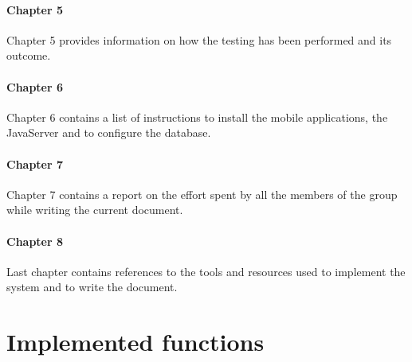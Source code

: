 \documentclass[a4paper,oneside,11pt]{book}
\begin{document}
    \subsubsection{Chapter 5}
    Chapter 5 provides information on how the testing has been performed and its outcome. 

    \subsubsection{Chapter 6}
    Chapter 6 contains a list of instructions to install the mobile applications, the JavaServer and to configure the database.

    \subsubsection{Chapter 7}
    Chapter 7 contains a report on the effort spent by all the members of the group while writing the current document.
    
    \subsubsection{Chapter 8}
    Last chapter contains references to the tools and resources used to implement the system and to write the document.

\chapter{Implemented functions}
\end{document}
